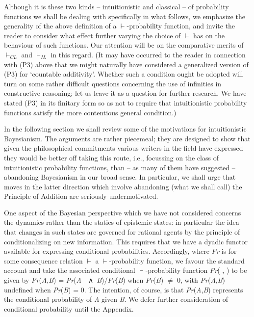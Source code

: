 \documentclass[
  11pt,
  letterpaper,
  DIV=11,
  numbers=noendperiod,
  twoside]{scrartcl}
\begin{document}
Although it is these two kinds -- intuitionistic and classical -- of
probability functions we shall be dealing with specifically in what
follows, we emphasize the generality of the above definition of a
\(\vdash\)-probability function, and invite the reader to consider what
effect further varying the choice of \(\vdash\) has on the behaviour of
such functions. Our attention will be on the comparative merits of
\(\vdash_{CL}\) and \(\vdash_{IL}\) in this regard. (It may have
occurred to the reader in connection with (P3) above that we might
naturally have considered a generalized version of (P3) for `countable
additivity'. Whether such a condition ought be adopted will turn on some
rather difficult questions concerning the use of infinities in
constructive reasoning; let us leave it as a question for further
research. We have stated (P3) in its finitary form so as not to require
that intuitionistic probability functions satisfy the more contentious
general condition.)

In the following section we shall review some of the motivations for
intuitionistic Bayesianism. The arguments are rather piecemeal; they are
designed to show that given the philosophical commitments various
writers in the field have expressed they would be better off taking this
route, i.e., focussing on the class of intuitionistic probability
functions, than -- as many of them have suggested --abandoning
Bayesianism in our broad sense. In particular, we shall urge that moves
in the latter direction which involve abandoning (what we shall call)
the Principle of Addition are seriously undermotivated.

One aspect of the Bayesian perspective which we have not considered
concerns the dynamics rather than the statics of epistemic states: in
particular the idea that changes in such states are governed for
rational agents by the principle of conditionalizing on new information.
This requires that we have a dyadic functor available for expressing
conditional probabilities. Accordingly, where \emph{Pr} is for some
consequence relation \(\vdash\) a \(\vdash\)-probability function, we
favour the standard account and take the associated conditional
\(\vdash\)-probability function \emph{Pr}( , ) to be given by
\emph{Pr}(\emph{A},\emph{B}) =
\emph{Pr}(\emph{A}~~∧~\emph{B})/\emph{Pr}(\emph{B}) when
\emph{Pr}(\emph{B}) \({\neq}\) 0, with \emph{Pr}(\emph{A},\emph{B})
undefined when \emph{Pr}(\emph{B}) = 0. The intention, of course, is
that \emph{Pr}(\emph{A},\emph{B}) represents the conditional probability
of \emph{A} given \emph{B}. We defer further consideration of
conditional probability until the Appendix.
\end{document}
